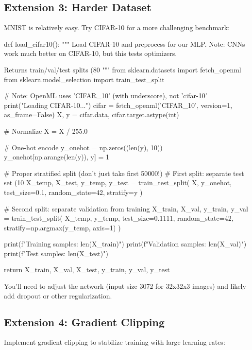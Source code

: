 \documentclass[../../main.tex]{subfiles}
\begin{document}
\subsection{Extension 3: Harder Dataset}

MNIST is relatively easy. Try CIFAR-10 for a more challenging benchmark:

\begin{pythoncode}
def load_cifar10():
    """
    Load CIFAR-10 and preprocess for our MLP.
    Note: CNNs work much better on CIFAR-10, but this tests optimizers.

    Returns train/val/test splits (80%
    """
    from sklearn.datasets import fetch_openml
    from sklearn.model_selection import train_test_split

    # Note: OpenML uses 'CIFAR_10' (with underscore), not 'cifar-10'
    print("Loading CIFAR-10...")
    cifar = fetch_openml('CIFAR_10', version=1, as_frame=False)
    X, y = cifar.data, cifar.target.astype(int)

    # Normalize
    X = X / 255.0

    # One-hot encode
    y_onehot = np.zeros((len(y), 10))
    y_onehot[np.arange(len(y)), y] = 1

    # Proper stratified split (don't just take first 50000!)
    # First split: separate test set (10%
    X_temp, X_test, y_temp, y_test = train_test_split(
        X, y_onehot, test_size=0.1, random_state=42, stratify=y
    )

    # Second split: separate validation from training
    X_train, X_val, y_train, y_val = train_test_split(
        X_temp, y_temp, test_size=0.1111, random_state=42,
        stratify=np.argmax(y_temp, axis=1)
    )

    print(f"Training samples: {len(X_train)}")
    print(f"Validation samples: {len(X_val)}")
    print(f"Test samples: {len(X_test)}")

    return X_train, X_val, X_test, y_train, y_val, y_test
\end{pythoncode}

You'll need to adjust the network (input size 3072 for 32x32x3 images) and likely add dropout or other regularization.

\subsection{Extension 4: Gradient Clipping}

Implement gradient clipping to stabilize training with large learning rates:
\end{document}
